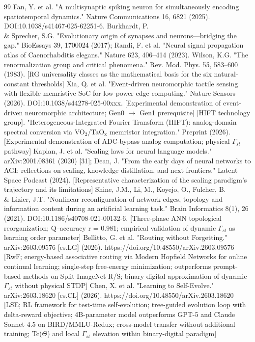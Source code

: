 \documentclass[a4paper,12pt]{article}
\providecommand{\textsubscript}[1]{\ensuremath{_{\text{#1}}}}
\begin{document}
\begin{thebibliography}{99}
 Fan, Y. et al. "A multisynaptic spiking neuron for simultaneously encoding spatiotemporal dynamics." Nature Communications 16, 6821 (2025). DOI:10.1038/s41467-025-62251-6.
 Burkhardt, P. \\& Sprecher, S.G. "Evolutionary origin of synapses and neurons---bridging the gap." BioEssays 39, 1700024 (2017); Randi, F. et al. "Neural signal propagation atlas of Caenorhabditis elegans." Nature 623, 406--414 (2023).
 Wilson, K.G. "The renormalization group and critical phenomena." Rev. Mod. Phys. 55, 583--600 (1983). [RG universality classes as the mathematical basis for the six natural-constant thresholds]
 Xia, Q. et al. "Event-driven neuromorphic tactile sensing with flexible memristive SoC for low-power edge computing." Nature Sensors (2026). DOI:10.1038/s44278-025-00xxx. [Experimental demonstration of event-driven neuromorphic architecture; Gen0 $\rightarrow$ Gen1 prerequisite]
 [HIFT technology group]. "Heterogeneous-Integrated Fourier Transform (HIFT): analog-domain spectral conversion via VO\textsubscript{2}/TaO\textsubscript{x} memristor integration." Preprint (2026). [Experimental demonstration of ADC-bypass analog computation; physical $\Gamma_{st}$ pathway]
 Kaplan, J. et al. "Scaling laws for neural language models." arXiv:2001.08361 (2020) [31]; Dean, J. "From the early days of neural networks to AGI: reflections on scaling, knowledge distillation, and next frontiers." Latent Space Podcast (2024). [Representative characterization of the scaling paradigm's trajectory and its limitations]
 Shine, J.M., Li, M., Koyejo, O., Fulcher, B. \\& Lizier, J.T. "Nonlinear reconfiguration of network edges, topology and information content during an artificial learning task." Brain Informatics 8(1), 26 (2021). DOI:10.1186/s40708-021-00132-6. [Three-phase ANN topological reorganization; Q--accuracy r = 0.981; empirical validation of dynamic $\Gamma_{st}$ as learning order parameter]
 Bellitto, G. et al. "Routing without Forgetting." arXiv:2603.09576 [cs.LG] (2026). https://doi.org/10.48550/arXiv.2603.09576 [RwF; energy-based associative routing via Modern Hopfield Networks for online continual learning; single-step free-energy minimization; outperforms prompt-based methods on Split-ImageNet-R/S; binary-digital approximation of dynamic $\Gamma_{st}$ without physical STDP]
 Chen, X. et al. "Learning to Self-Evolve." arXiv:2603.18620 [cs.CL] (2026). https://doi.org/10.48550/arXiv.2603.18620 [LSE; RL framework for test-time self-evolution; tree-guided evolution loop with delta-reward objective; 4B-parameter model outperforms GPT-5 and Claude Sonnet 4.5 on BIRD/MMLU-Redux; cross-model transfer without additional training; Tc($\Theta$) and local $\Gamma_{st}$ elevation within binary-digital paradigm]

\end{thebibliography}
\end{document}
